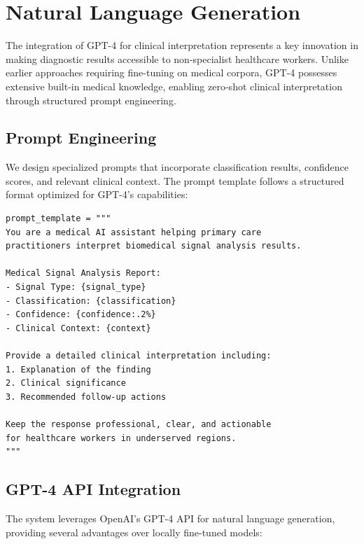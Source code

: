 \documentclass[conference]{IEEEtran}
\begin{document}
\section{Natural Language Generation}

The integration of GPT-4 for clinical interpretation represents a key innovation in making diagnostic results accessible to non-specialist healthcare workers. Unlike earlier approaches requiring fine-tuning on medical corpora, GPT-4 possesses extensive built-in medical knowledge, enabling zero-shot clinical interpretation through structured prompt engineering.

\subsection{Prompt Engineering}

We design specialized prompts that incorporate classification results, confidence scores, and relevant clinical context. The prompt template follows a structured format optimized for GPT-4's capabilities:

\begin{lstlisting}[caption={Prompt template for GPT-4 interpretation},label={lst:prompt}]
prompt_template = """
You are a medical AI assistant helping primary care
practitioners interpret biomedical signal analysis results.

Medical Signal Analysis Report:
- Signal Type: {signal_type}
- Classification: {classification}
- Confidence: {confidence:.2%}
- Clinical Context: {context}

Provide a detailed clinical interpretation including:
1. Explanation of the finding
2. Clinical significance
3. Recommended follow-up actions

Keep the response professional, clear, and actionable
for healthcare workers in underserved regions.
"""
\end{lstlisting}

\subsection{GPT-4 API Integration}

The system leverages OpenAI's GPT-4 API for natural language generation, providing several advantages over locally fine-tuned models:
\end{document}
